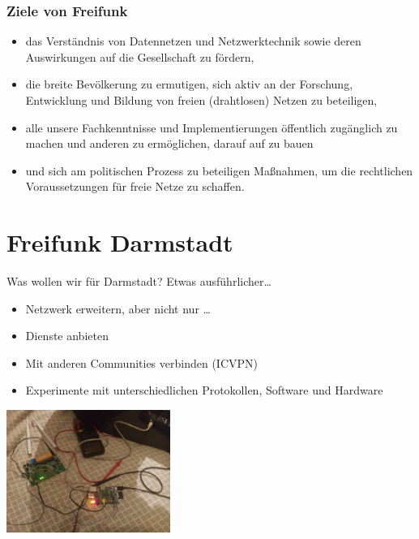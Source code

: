 \documentclass[handout]{beamer}
\begin{document}
\begin{frame}
	\frametitle{Ziele von Freifunk}
	\begin{itemize}[<+->]
		\item das Verständnis von Datennetzen und Netzwerktechnik sowie deren Auswirkungen auf die Gesellschaft zu fördern,
		\item die breite Bevölkerung zu ermutigen, sich aktiv an der Forschung, Entwicklung und Bildung von freien (drahtlosen) Netzen zu beteiligen,
		\item 	alle unsere Fachkenntnisse und Implementierungen öffentlich zugänglich zu machen und anderen zu ermöglichen, darauf auf zu bauen
		\item und sich am politischen Prozess zu beteiligen Maßnahmen, um die rechtlichen Voraussetzungen für freie Netze zu schaffen.
	\end{itemize}
\end{frame}


\section{Freifunk Darmstadt}









\begin{frame}{Was wollen wir für Darmstadt?}
\vfill
Etwas ausführlicher\ldots
\begin{itemize}
\pause\item Netzwerk erweitern\pause, aber nicht nur \ldots
\pause\item Dienste anbieten
\pause\item Mit anderen Communities verbinden (ICVPN)
\pause\item Experimente mit unterschiedlichen Protokollen, Software und Hardware
\end{itemize}
\begin{center}
\vfill
\includegraphics[width=0.4\textwidth]{images/disassemble}
\end{center}
\vfill
\end{frame}
\end{document}
